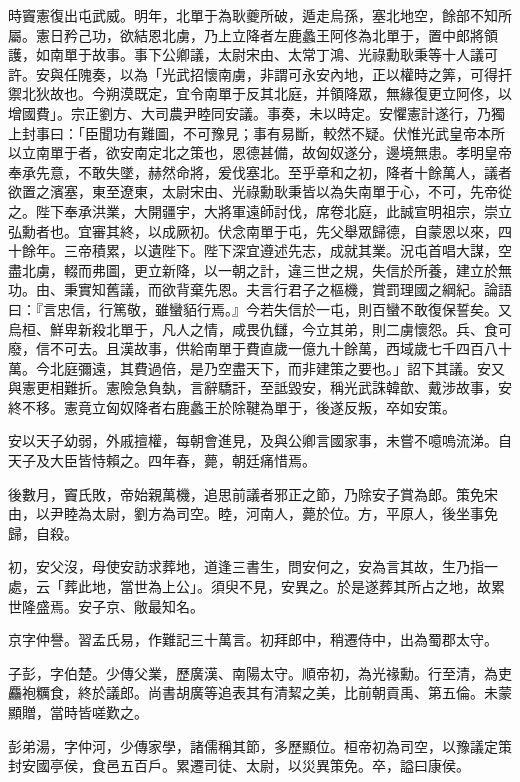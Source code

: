 \begin{pinyinscope}
時竇憲復出屯武威。明年，北單于為耿夔所破，遁走烏孫，塞北地空，餘部不知所屬。憲日矜己功，欲結恩北虜，乃上立降者左鹿蠡王阿佟為北單于，置中郎將領護，如南單于故事。事下公卿議，太尉宋由、太常丁鴻、光祿勳耿秉等十人議可許。安與任隗奏，以為「光武招懷南虜，非謂可永安內地，正以權時之筭，可得扞禦北狄故也。今朔漠既定，宜令南單于反其北庭，并領降眾，無緣復更立阿佟，以增國費」。宗正劉方、大司農尹睦同安議。事奏，未以時定。安懼憲計遂行，乃獨上封事曰：「臣聞功有難圖，不可豫見；事有易斷，較然不疑。伏惟光武皇帝本所以立南單于者，欲安南定北之策也，恩德甚備，故匈奴遂分，邊境無患。孝明皇帝奉承先意，不敢失墜，赫然命將，爰伐塞北。至乎章和之初，降者十餘萬人，議者欲置之濱塞，東至遼東，太尉宋由、光祿勳耿秉皆以為失南單于心，不可，先帝從之。陛下奉承洪業，大開疆宇，大將軍遠師討伐，席卷北庭，此誠宣明祖宗，崇立弘勳者也。宜審其終，以成厥初。伏念南單于屯，先父舉眾歸德，自蒙恩以來，四十餘年。三帝積累，以遺陛下。陛下深宜遵述先志，成就其業。況屯首唱大謀，空盡北虜，輟而弗圖，更立新降，以一朝之計，違三世之規，失信於所養，建立於無功。由、秉實知舊議，而欲背棄先恩。夫言行君子之樞機，賞罰理國之綱紀。論語曰：『言忠信，行篤敬，雖蠻貊行焉。』今若失信於一屯，則百蠻不敢復保誓矣。又烏桓、鮮卑新殺北單于，凡人之情，咸畏仇讎，今立其弟，則二虜懷怨。兵、食可廢，信不可去。且漢故事，供給南單于費直歲一億九十餘萬，西域歲七千四百八十萬。今北庭彌遠，其費過倍，是乃空盡天下，而非建策之要也。」詔下其議。安又與憲更相難折。憲險急負埶，言辭驕訐，至詆毀安，稱光武誅韓歆、戴涉故事，安終不移。憲竟立匈奴降者右鹿蠡王於除鞬為單于，後遂反叛，卒如安策。

安以天子幼弱，外戚擅權，每朝會進見，及與公卿言國家事，未嘗不噫嗚流涕。自天子及大臣皆恃賴之。四年春，薨，朝廷痛惜焉。

後數月，竇氏敗，帝始親萬機，追思前議者邪正之節，乃除安子賞為郎。策免宋由，以尹睦為太尉，劉方為司空。睦，河南人，薨於位。方，平原人，後坐事免歸，自殺。

初，安父沒，母使安訪求葬地，道逢三書生，問安何之，安為言其故，生乃指一處，云「葬此地，當世為上公」。須臾不見，安異之。於是遂葬其所占之地，故累世隆盛焉。安子京、敞最知名。

京字仲譽。習孟氏易，作難記三十萬言。初拜郎中，稍遷侍中，出為蜀郡太守。

子彭，字伯楚。少傳父業，歷廣漢、南陽太守。順帝初，為光禒勳。行至清，為吏麤袍糲食，終於議郎。尚書胡廣等追表其有清絜之美，比前朝貢禹、第五倫。未蒙顯贈，當時皆嗟歎之。

彭弟湯，字仲河，少傳家學，諸儒稱其節，多歷顯位。桓帝初為司空，以豫議定策封安國亭侯，食邑五百戶。累遷司徒、太尉，以災異策免。卒，謚曰康侯。


\end{pinyinscope}
